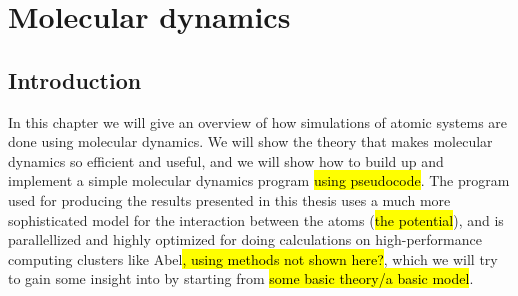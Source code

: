 \documentclass[twoside,english,a4paper]{uiofysmaster}
\begin{document}
\part{Molecular dynamics}
\chapter{Introduction}
In this chapter we will give an overview of how simulations of atomic systems are done using molecular dynamics. We will show the theory that makes molecular dynamics so efficient and useful, and we will show how to build up and implement a simple molecular dynamics program \hl{using pseudocode}. The program used for producing the results presented in this thesis uses a much more sophisticated model for the interaction between the atoms (\hl{the potential}), and is parallellized and highly optimized for doing calculations on high-performance computing clusters like Abel\hl{, using methods not shown here?}, which we will try to gain some insight into by starting from \hl{some basic theory/a basic model}.

% 
% 
% 
% 
\end{document}
